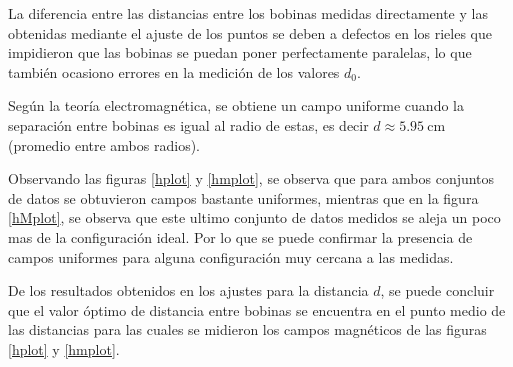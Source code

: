 \documentclass[12pt,a4paper]{article}
\begin{document}
La diferencia entre las distancias entre los bobinas medidas directamente y las obtenidas mediante el ajuste de los puntos se deben a defectos en los rieles que impidieron que las bobinas se puedan poner perfectamente paralelas, lo que también ocasiono errores en la medición de los valores $d_0$.

\hspace{1cm}

Según la teoría electromagnética, se obtiene un campo uniforme cuando la separación entre bobinas es igual al radio de estas, es decir $d \approx \SI{5.95}{\centi\meter}$ (promedio entre ambos radios).

\hspace{1cm}


Observando las figuras \ref{hplot} y \ref{hmplot}, se observa que para ambos conjuntos de datos se obtuvieron campos bastante uniformes, mientras que en la figura \ref{hMplot}, se observa que este ultimo conjunto de datos medidos se aleja un poco mas de la configuración ideal. Por lo que se puede confirmar la presencia de campos uniformes para alguna configuración muy cercana a las medidas. 

\hspace{1cm}

De los resultados obtenidos en los ajustes para la distancia $d$, se puede concluir que el valor \'optimo de distancia entre bobinas se encuentra en el punto medio de las distancias para las cuales se midieron los campos magnéticos de las figuras \ref{hplot} y \ref{hmplot}.
\end{document}
